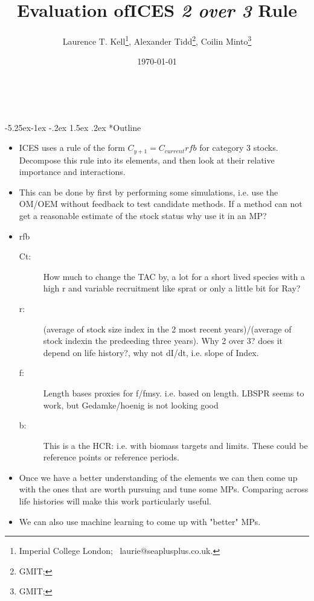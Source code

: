 \documentclass[a4paper, 10pt]{article}
\title{Evaluation ofICES \textit{2 over 3} Rule}
\author{Laurence T. Kell\footnote{Imperial College London; ~laurie@seaplusplus.co.uk.},
        Alexander Tidd\footnote{GMIT;},
        Coilin Minto\footnote{GMIT;}}
\date{\today}
\makeatletter
\renewcommand{\section}{\@startsection{section}{1}{\z@}%
 {-5.25ex\@plus -1ex \@minus -.2ex}%
 {1.5ex \@plus .2ex}%
 {\normalfont\bfseries}}
\makeatother
\begin{document}
\onehalfspacing
{}
\rhead{}

\maketitle
\thispagestyle{fancy}
\pagestyle{empty}


\tableofcontents\newpage\


\section*{Outline}

\begin{itemize}

 \item ICES uses a rule of the form $C_{y+1} = C_{current}rfb$ for category 3 stocks. Decompose this rule into its elements, and then look at their relative importance and interactions. 
 \item This can be done by first by performing some simulations, i.e. use the OM/OEM without feedback to test candidate methods. If a method can not get a reasonable estimate of the stock status why use it in an MP?
\item rfb
\begin{description}
 \item[Ct:] How much to change the TAC by, a lot for a short lived species with a high r and variable recruitment like sprat or only a little bit for Ray? 
 \item[r:] (average of stock size index in the 2 most recent years)/(average of stock indexin the predeeding three years). Why 2 over 3? does it depend on life history?, why not dI/dt, i.e. slope of Index.
 \item[f:] Length bases proxies for f/fmsy. i.e. based on length. LBSPR seems to work, but Gedamke/hoenig is not looking good      
  \item[b:] This is a the HCR: i.e. with biomass targets and limits. These could be reference points or reference periods.
\end{description}
\item Once we have a better understanding of the elements we can then come up with the ones that are worth pursuing and tune some MPs. Comparing across life histories will make this work particularly useful.
\item We can also use machine learning to come up with "better" MPs.
\end{itemize}
\end{document}
